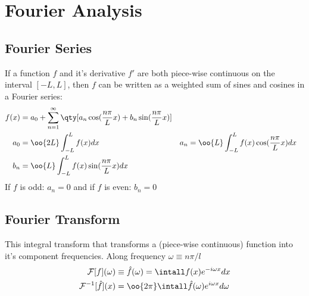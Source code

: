 \NewDocumentCommand{}
\section{Fourier Analysis}       
\subsection{Fourier Series}
If a function $f$ and it's derivative $f'$ are both piece-wise continuous on the interval $[-L,L]$, then $f$ can be written as a weighted sum of sines and cosines in a Fourier series:
\begin{align*}
    f(x)
    &=a_0+\sum_{n=1}^\infty \qty[a_n\ft+b_n\ft*]
    \\
    a_0
    &=\oo{2L}\int_{-L}^L f(x)dx
    &
    a_n
    &= \oo{L} \int_{-L}^L f(x)\ft dx
    \\
    b_n
    &= \oo{L} \int_{-L}^L f(x)\ft* dx
\end{align*}
If $f$ is odd: $a_n=0$ and if $f$ is even: $b_n=0$
\subsection{Fourier Transform}
This integral transform that transforms a (piece-wise continuous) function into it's component frequencies. Along frequency $\omega\equiv n\pi/l$
\begin{align*}
    \mathcal{F}[f](\omega)&\equiv\hat{f}(\omega)=\intall f(x)e^{-i\omega x}dx
    \\
    \mathcal{F}^{-1}[\hat{f}](x)&=\oo{2\pi}\intall \hat{f}(\omega)e^{i\omega x}d\omega
\end{align*}
%